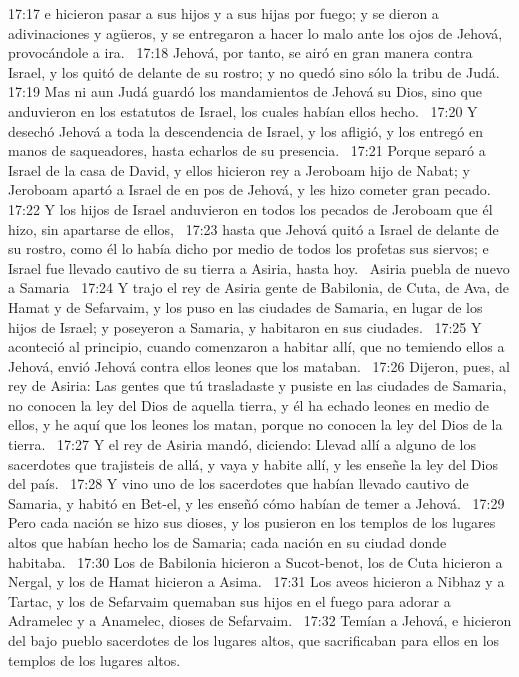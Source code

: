 17:17 e hicieron pasar a sus hijos y a sus hijas por fuego; y se dieron a adivinaciones y agüeros, y se entregaron a hacer lo malo ante los ojos de Jehová, provocándole a ira.  
17:18 Jehová, por tanto, se airó en gran manera contra Israel, y los quitó de delante de su rostro; y no quedó sino sólo la tribu de Judá.  
17:19 Mas ni aun Judá guardó los mandamientos de Jehová su Dios, sino que anduvieron en los estatutos de Israel, los cuales habían ellos hecho.  
17:20 Y desechó Jehová a toda la descendencia de Israel, y los afligió, y los entregó en manos de saqueadores, hasta echarlos de su presencia.  
17:21 Porque separó a Israel de la casa de David, y ellos hicieron rey a Jeroboam hijo de Nabat; y Jeroboam apartó a Israel de en pos de Jehová, y les hizo cometer gran pecado.  
17:22 Y los hijos de Israel anduvieron en todos los pecados de Jeroboam que él hizo, sin apartarse de ellos,  
17:23 hasta que Jehová quitó a Israel de delante de su rostro, como él lo había dicho por medio de todos los profetas sus siervos; e Israel fue llevado cautivo de su tierra a Asiria, hasta hoy.  
Asiria puebla de nuevo a Samaria  
17:24 Y trajo el rey de Asiria gente de Babilonia, de Cuta, de Ava, de Hamat y de Sefarvaim, y los puso en las ciudades de Samaria, en lugar de los hijos de Israel; y poseyeron a Samaria, y habitaron en sus ciudades.  
17:25 Y aconteció al principio, cuando comenzaron a habitar allí, que no temiendo ellos a Jehová, envió Jehová contra ellos leones que los mataban.  
17:26 Dijeron, pues, al rey de Asiria: Las gentes que tú trasladaste y pusiste en las ciudades de Samaria, no conocen la ley del Dios de aquella tierra, y él ha echado leones en medio de ellos, y he aquí que los leones los matan, porque no conocen la ley del Dios de la tierra.  
17:27 Y el rey de Asiria mandó, diciendo: Llevad allí a alguno de los sacerdotes que trajisteis de allá, y vaya y habite allí, y les enseñe la ley del Dios del país.  
17:28 Y vino uno de los sacerdotes que habían llevado cautivo de Samaria, y habitó en Bet-el, y les enseñó cómo habían de temer a Jehová.  
17:29 Pero cada nación se hizo sus dioses, y los pusieron en los templos de los lugares altos que habían hecho los de Samaria; cada nación en su ciudad donde habitaba.  
17:30 Los de Babilonia hicieron a Sucot-benot, los de Cuta hicieron a Nergal, y los de Hamat hicieron a Asima.  
17:31 Los aveos hicieron a Nibhaz y a Tartac, y los de Sefarvaim quemaban sus hijos en el fuego para adorar a Adramelec y a Anamelec, dioses de Sefarvaim.  
17:32 Temían a Jehová, e hicieron del bajo pueblo sacerdotes de los lugares altos, que sacrificaban para ellos en los templos de los lugares altos.  
